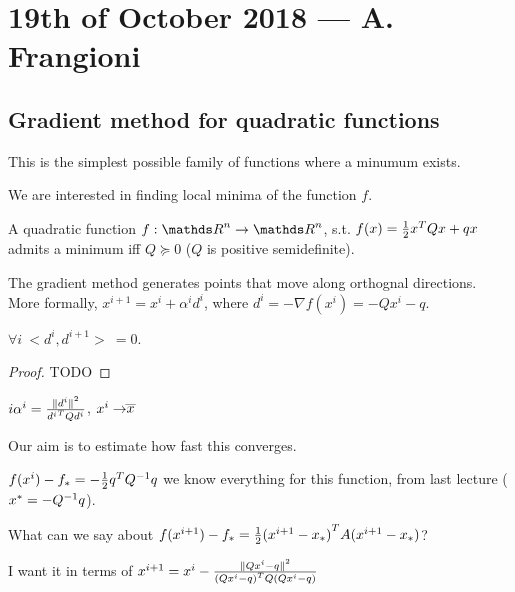 \documentclass[ComputationalMathematics.tex]{subfiles}
\begin{document}
\section{19th of October 2018 --- A. Frangioni}


\subsection{Gradient method for quadratic functions}
This is the simplest possible family of functions where a minumum exists.


We are interested in finding local minima of the function $f$.

\begin{proposition}
  A quadratic function $f: {\R}^n \rightarrow {\R}^n$, s.t. $f(x) = \frac{1}{2} {x}^{T} Q x + qx$ admits a minimum iff $Q \succeq 0$ ($Q$ is positive semidefinite).
\end{proposition}

The gradient method generates points that move along orthognal directions. More formally, $x^{i+1} = x^{i} + \alpha^{i}d^{i}$, where $d^{i} = -\nabla f(x^{i}) = -Qx^{i} -q$.



\begin{proposition}
  $\forall i ~ <d^{i}, d^{i+1}> ~ = 0$.
\end{proposition}
\begin{proof}
TODO
\end{proof}

$i{\alpha}^{i} = \frac{{\|d^{i}\|}^{2}}{{d^{i}}^{T}Q d^{i}}$, $x^{i} \rightarrow \barr{x}$

Our aim is to estimate how fast this converges.

$f(x^{i}) - f_{*}= - \frac{1}{2} {q}^{T} {Q}^{-1} q $ we know everything for this function, from last lecture ($x^{*} = -{Q}^{-1} q$).

What  can we say about $f(x^{i+1}) - f_{*} = \frac{1}{2} {(x^{i+1} - x_{*})}^{T} A (x^{i+1} - x_{*})$?

I want it in terms of $x^{i+1} = x^{i} - \frac{{\|Qx^{i} - q\|}^{2}}{{(Q{x}^{i} - q)}^{T}Q(Qx^{i}-q)}$
\end{document}
